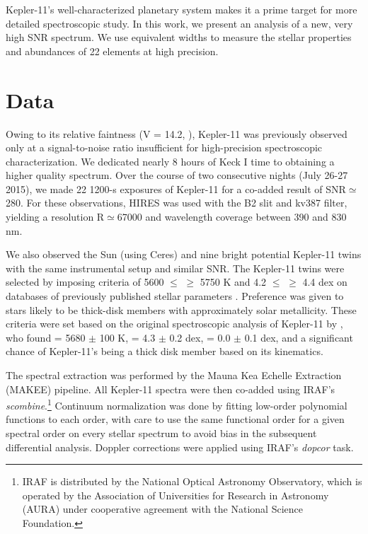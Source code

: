 \documentclass[oneside]{emulateapj}
\begin{document}
Kepler-11's well-characterized planetary system makes it a prime target for more detailed spectroscopic study. In this work, we present an analysis of a new, very high SNR spectrum. We use equivalent widths to measure the stellar properties and abundances of 22 elements at high precision.


\section{Data}

Owing to its relative faintness (V = 14.2, \citet{Lissauer2011}), Kepler-11 was previously observed only at a signal-to-noise ratio insufficient for high-precision spectroscopic characterization. We dedicated nearly 8 hours of Keck I time to obtaining a higher quality spectrum. Over the course of two consecutive nights (July 26-27 2015), we made 22 1200-s exposures of Kepler-11 for a co-added result of SNR$\simeq$280. For these observations, HIRES was used with the B2 slit and kv387 filter, yielding a resolution R$\simeq$67000 and wavelength coverage between 390 and 830 nm.

We also observed the Sun (using Ceres) and nine bright potential Kepler-11 twins with the same instrumental setup and similar SNR. The Kepler-11 twins were selected by imposing criteria of 5600 $\leq$ \teff$\geq$ 5750 K and 4.2 $\leq$ \logg $\geq$ 4.4 dex on databases of previously published stellar parameters \citep{Adibekyan2012, Bensby2014}. Preference was given to stars likely to be thick-disk members with approximately solar metallicity. These criteria were set based on the original spectroscopic analysis of Kepler-11 by \citet{Lissauer2011}, who found \teff = 5680 $\pm$ 100 K, \logg = 4.3 $\pm$ 0.2 dex, \feh = 0.0 $\pm$ 0.1 dex, and a significant chance of Kepler-11's being a thick disk member based on its kinematics.

The spectral extraction was performed by the Mauna Kea Echelle Extraction (MAKEE) pipeline. All Kepler-11 spectra were then co-added using IRAF's \textit{scombine}.\footnote{IRAF is distributed by the National Optical Astronomy Observatory, which is operated by the Association of Universities for Research in Astronomy (AURA) under cooperative agreement with the National Science Foundation.} Continuum normalization was done by fitting low-order polynomial functions to each order, with care to use the same functional order for a given spectral order on every stellar spectrum to avoid bias in the subsequent differential analysis. Doppler corrections were applied using IRAF's \textit{dopcor} task.
\end{document}
